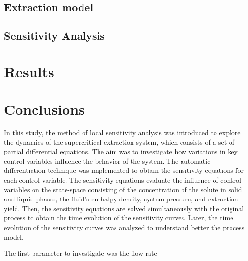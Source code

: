 \documentclass[a4paper,fleqn]{cas-dc}
\begin{document}
\subsection{Extraction model} \label{CH: Extraction_model}


%

\subsection{Sensitivity Analysis} \label{CH: Sensitivity_Analysis}


%

\section{Results}


\section{Conclusions} \label{CH: Conclusion}

In this study, the method of local sensitivity analysis was introduced to explore the dynamics of the supercritical extraction system, which consists of a set of partial differential equations. The aim was to investigate how variations in key control variables influence the behavior of the system. The automatic differentiation technique was implemented to obtain the sensitivity equations for each control variable. The sensitivity equations evaluate the influence of control variables on the state-space consisting of the concentration of the solute in solid and liquid phases, the fluid's enthalpy density, system pressure, and extraction yield. Then, the sensitivity equations are solved simultaneously with the original process to obtain the time evolution of the sensitivity curves. Later, the time evolution of the sensitivity curves was analyzed to understand better the process model. 

The first parameter to investigate was the flow-rate
\end{document}
